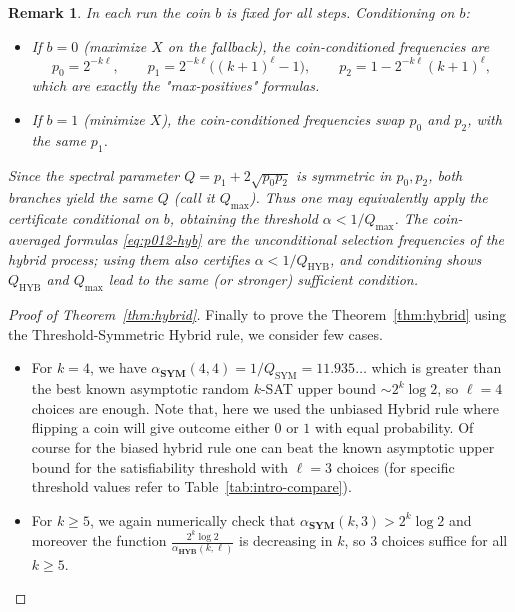 \documentclass[11pt,reqno]{amsart}
\numberwithin{equation}{section}
\newcommand\Thm{Theorem}
\newtheorem{remark}[definition]{Remark}
\newcommand{\HYB}{\mathrm{HYB}}
\begin{document}
	\begin{remark}\label{rem:hyb-conditional}
		In each run the coin $b$ is fixed for all steps. Conditioning on $b$:
		\begin{itemize}
			\item If $b=0$ (maximize $X$ on the fallback), the \emph{coin-conditioned} frequencies are
			\[
			p_0=2^{-k\ell},\qquad
			p_1=2^{-k\ell}\big((k+1)^\ell-1\big),\qquad
			p_2=1-2^{-k\ell}(k+1)^\ell,
			\]
			which are exactly the "max-positives" formulas.
			\item If $b=1$ (minimize $X$), the coin-conditioned frequencies swap $p_0$ and $p_2$, with the same $p_1$.
		\end{itemize}
		Since the spectral parameter $Q=p_1+2\sqrt{p_0p_2}$ is symmetric in $p_0,p_2$,
		both branches yield the \emph{same} $Q$ (call it $Q_{\max}$). Thus one may
		equivalently apply the certificate \emph{conditional on $b$}, obtaining the
		threshold $\alpha<1/Q_{\max}$. The coin-\emph{averaged} formulas
		\eqref{eq:p012-hyb} are the unconditional selection frequencies of the hybrid
		process; using them also certifies $\alpha<1/Q_{\HYB}$, and conditioning shows
		$Q_{\HYB}$ and $Q_{\max}$ lead to the same (or stronger) sufficient condition.
	\end{remark}
	\begin{proof}[Proof of \Thm~\ref{thm:hybrid}]
		Finally to prove the \Thm~\ref{thm:hybrid} using the Threshold-Symmetric Hybrid rule, we consider few cases.
		\begin{itemize}
			\item For $k=4$, we have $\alpha_{\mathbf{SYM}}(4,4)=1/Q_{\mathrm{SYM}}=11.935\dots$ which is greater than the best known asymptotic random $k$-SAT upper bound $\sim 2^k\log 2$, so $\ell=4$ choices are enough.
			Note that, here we used the unbiased Hybrid rule where flipping a coin will give outcome either $0$ or $1$ with equal probability. 
			Of course for the biased hybrid rule one can beat the known asymptotic upper bound for the satisfiability threshold with $\ell=3$ choices (for specific threshold values refer to Table~\ref{tab:intro-compare}).
			\item For $k\geq 5$, we again numerically check that $\alpha_{\mathbf{SYM}}(k,3)>2^k\log 2$ and moreover the function $\frac{2^k\log 2}{\alpha_{\mathbf{HYB}}(k,\ell)}$ is decreasing in $k$, so $3$ choices suffice for all $k\geq 5$.
		\end{itemize}
	\end{proof}
		
\end{document}
